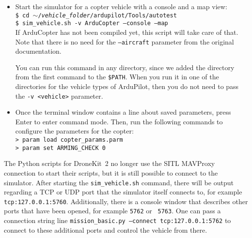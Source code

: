 \documentclass{article}
\begin{document}
\begin{itemize}
    \item Start the simulator for a copter vehicle with a console and a map 
          view: \\
          {\tt \$ cd $\sim$/\emph{vehicle\_folder}/ardupilot/Tools/autotest} \\
          {\tt \$ sim\_vehicle.sh -v ArduCopter --console --map} \\
          If ArduCopter has not been compiled yet, this script will take care 
          of that. Note that there is no need for the {\tt --aircraft} 
          parameter from the original documentation.

          You can run this command in any directory, since we added the 
          directory from the first command to the {\tt \$PATH}. When you run it 
          in one of the directories for the vehicle types of ArduPilot, then 
          you do not need to pass the {\tt -v <vehicle>} parameter.
    \item Once the terminal window contains a line about saved parameters, 
          press Enter to enter command mode. Then, run the following commands 
          to configure the parameters for the copter: \\
          {\tt > param load copter\_params.parm} \\
          {\tt > param set ARMING\_CHECK 0}
\end{itemize}

\vspace{0.4cm}

The Python scripts for DroneKit~2 no longer use the SITL MAVProxy connection to 
start their scripts, but it is still possible to connect to the simulator. 
After starting the {\tt sim\_vehicle.sh} command, there will be output 
regarding a TCP or UDP port that the simulator itself connects to, for example 
{\tt tcp:127.0.0.1:5760}. Additionally, there is a console window that 
describes other ports that have been opened, for example {\tt 5762} or {\tt 
5763}. One can pass a connection string line {\tt mission\_basic.py --connect 
tcp:127.0.0.1:5762} to connect to these additional ports and control the 
vehicle from there.
\end{document}
